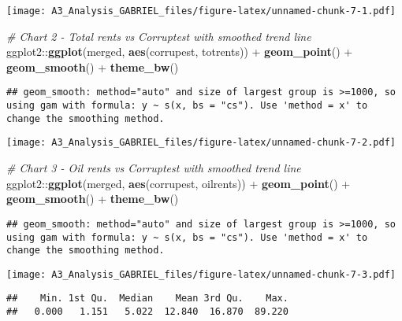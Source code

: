 \documentclass[]{article}
\newenvironment{Shaded}{\begin{snugshade}}{\end{snugshade}}
\newcommand{\KeywordTok}[1]{\textcolor[rgb]{0.13,0.29,0.53}{\textbf{{#1}}}}
\newcommand{\StringTok}[1]{\textcolor[rgb]{0.31,0.60,0.02}{{#1}}}
\newcommand{\CommentTok}[1]{\textcolor[rgb]{0.56,0.35,0.01}{\textit{{#1}}}}
\newcommand{\NormalTok}[1]{{#1}}
\begin{document}
\texttt{[image: A3\_Analysis\_GABRIEL\_files/figure-latex/unnamed-chunk-7-1.pdf]}

\begin{Shaded}
\begin{Highlighting}[]
\CommentTok{# Chart 2 - Total rents vs Corruptest with smoothed trend line}
\NormalTok{ggplot2::}\KeywordTok{ggplot}\NormalTok{(merged, }\KeywordTok{aes}\NormalTok{(corrupest, totrents)) +}
\StringTok{    }\KeywordTok{geom_point}\NormalTok{() +}\StringTok{ }\KeywordTok{geom_smooth}\NormalTok{() +}\StringTok{ }\KeywordTok{theme_bw}\NormalTok{()}
\end{Highlighting}
\end{Shaded}

\begin{verbatim}
## geom_smooth: method="auto" and size of largest group is >=1000, so using gam with formula: y ~ s(x, bs = "cs"). Use 'method = x' to change the smoothing method.
\end{verbatim}

\texttt{[image: A3\_Analysis\_GABRIEL\_files/figure-latex/unnamed-chunk-7-2.pdf]}

\begin{Shaded}
\begin{Highlighting}[]
\CommentTok{# Chart 3 - Oil rents vs Corruptest with smoothed trend line}
\NormalTok{ggplot2::}\KeywordTok{ggplot}\NormalTok{(merged, }\KeywordTok{aes}\NormalTok{(corrupest, oilrents)) +}
\StringTok{    }\KeywordTok{geom_point}\NormalTok{() +}\StringTok{ }\KeywordTok{geom_smooth}\NormalTok{() +}\StringTok{ }\KeywordTok{theme_bw}\NormalTok{()}
\end{Highlighting}
\end{Shaded}

\begin{verbatim}
## geom_smooth: method="auto" and size of largest group is >=1000, so using gam with formula: y ~ s(x, bs = "cs"). Use 'method = x' to change the smoothing method.
\end{verbatim}

\texttt{[image: A3\_Analysis\_GABRIEL\_files/figure-latex/unnamed-chunk-7-3.pdf]}

\begin{Shaded}
\end{Shaded}

\begin{verbatim}
##    Min. 1st Qu.  Median    Mean 3rd Qu.    Max. 
##   0.000   1.151   5.022  12.840  16.870  89.220
\end{verbatim}
\end{document}
